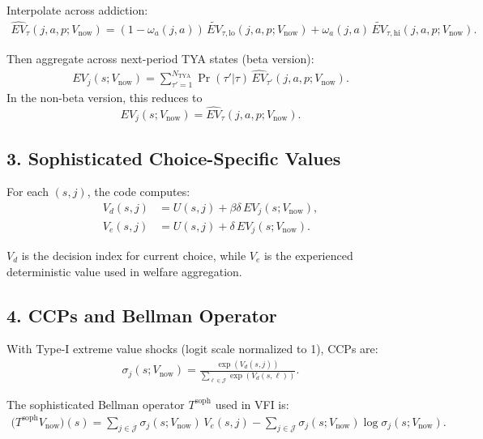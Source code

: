 \documentclass[a4paper, 11pt]{article}
\begin{document}
\noindent Interpolate across addiction:
\begin{align}
\widehat{EV}_{\tau}(j,a,p;V_{\text{now}})
= (1-\omega_a(j,a))\,\widetilde{EV}_{\tau,\text{lo}}(j,a,p;V_{\text{now}})
+ \omega_a(j,a)\,\widetilde{EV}_{\tau,\text{hi}}(j,a,p;V_{\text{now}}).
\end{align}

\noindent Then aggregate across next-period TYA states (beta version):
\begin{align}
EV_j(s;V_{\text{now}})
= \sum_{\tau'=1}^{N_{\text{TYA}}}\Pr(\tau'|\tau)\,\widehat{EV}_{\tau'}(j,a,p;V_{\text{now}}).
\label{eq:ev-main}
\end{align}
\noindent In the non-beta version, this reduces to
\[
EV_j(s;V_{\text{now}})=\widehat{EV}_{\tau}(j,a,p;V_{\text{now}}).
\]

\subsection*{3. Sophisticated Choice-Specific Values}

\noindent For each \((s,j)\), the code computes:
\begin{align}
V_d(s,j) &= U(s,j) + \beta\delta\,EV_j(s;V_{\text{now}}), \label{eq:vd-main}\\
V_e(s,j) &= U(s,j) + \delta\,EV_j(s;V_{\text{now}}). \label{eq:ve-main}
\end{align}

\noindent \(V_d\) is the decision index for current choice, while \(V_e\) is the experienced deterministic value used in welfare aggregation.

\subsection*{4. CCPs and Bellman Operator}

\noindent With Type-I extreme value shocks (logit scale normalized to 1), CCPs are:
\begin{align}
\sigma_j(s;V_{\text{now}})
= \frac{\exp(V_d(s,j))}{\sum_{\ell\in\mathcal{J}}\exp(V_d(s,\ell))}. \label{eq:ccp-main}
\end{align}

\noindent The sophisticated Bellman operator \(T^{\text{soph}}\) used in VFI is:
\begin{align}
\big(T^{\text{soph}}V_{\text{now}}\big)(s)
= \sum_{j\in\mathcal{J}}\sigma_j(s;V_{\text{now}})\,V_e(s,j)
- \sum_{j\in\mathcal{J}}\sigma_j(s;V_{\text{now}})\log \sigma_j(s;V_{\text{now}}).
\label{eq:Tsoph}
\end{align}
\end{document}

